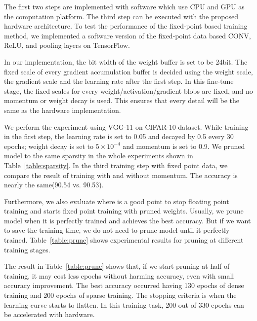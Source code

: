 The first two steps are implemented with software which use CPU and GPU as the computation platform. The third step can be executed with the proposed hardware architecture. To test the performance of the fixed-point based training method, we implemented a software version of the fixed-point data based CONV, ReLU, and pooling layers on TensorFlow.

In our implementation, the bit width of the weight buffer is set to be 24bit. The fixed scale of every gradient accumulation buffer is decided using the weight scale, the gradient scale and the learning rate after the first step. In this fine-tune stage, the fixed scales for every weight/activation/gradient blobs are fixed, and no momentum or weight decay is used. This ensures that every detail will be the same as the hardware implementation.

We perform the experiment using VGG-11\cite{Simonyan2014Very} on CIFAR-10\cite{krizhevsky2009learning} dataset. While training in the first step, the learning rate is set to 0.05 and decayed by 0.5 every 30 epochs; weight decay is set to $5 \times 10^{-4}$ and momentum is set to 0.9. We pruned model to the same sparsity in the whole experiments shown in Table~\ref{table:sparsity}. In the third training step with fixed point data, we compare the result of training with and without momentum. The accuracy is nearly the same(90.54 vs. 90.53). 

Furthermore, we also evaluate where is a good point to stop floating point training and starts fixed point training with pruned weights. Usually, we prune model when it is perfectly trained and achieves the best accuracy. But if we want to save the training time, we do not need to prune model until it perfectly trained. Table~\ref{table:prune} shows experimental results for pruning at different training stages. 



The result in Table~\ref{table:prune} shows that, if we start pruning at half of training, it may cost less epochs without harming accuracy, even with small accuracy improvement. The best accuracy occurred having 130 epochs of dense training and 200 epochs of sparse training. The stopping criteria is when the learning curve starts to flatten. In this training task, 200 out of 330 epochs can be accelerated with hardware.
